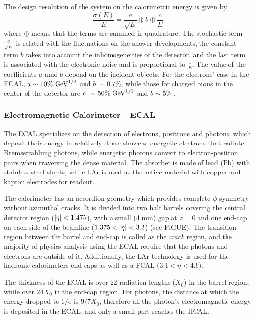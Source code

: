 The design resolution of the system on the calorimetric energy is given by
\begin{equation}
    \frac{\sigma(E)}{E} = 
    \frac{a}{\sqrt{E}} \oplus b \oplus \frac{c}{E}
\end{equation}
where \(\oplus\) means that the terms are summed in quadrature. The stochastic term \(\frac{a}{\sqrt{E}}\) is related with the fluctuations on the shower developments, the constant term \(b\) takes into account the inhomogeneities of the detector, and the last term is associated with the electronic noise and is proportional to \(\frac{1}{E}\). The value of the coefficients \(a\) amd \(b\) depend on the incident objects. For the electrons' case in the \ac{ECAL}, \(a\sim 10\%~\text{GeV}^{1/2}\) and \(b~\sim 0.7\%\), while those for charged pions in the center of the detector are \(a~\sim50\%~\text{GeV}^{1/2}\) and \(b\sim5\%\) \cite{PerformanceCalorimeteresRun2}.



\subsubsection{Electromagnetic Calorimeter - ECAL}

The \ac{ECAL} specializes on the detection of electrons, positrons and photons, which deposit their energy in relatively dense showers: energetic electrons that radiate Bremsstrahlung photons, while energetic photons convert to electron-positron pairs when traversing the dense material.
The absorber is made of lead (Pb) with stainless steel sheets, while \ac{LAr} is used as the active material with copper and kapton electrodes for readout.

The calorimeter has an accordion geometry which provides complete \(\phi\) symmetry without azimuthal cracks. 
It is divided into two half barrels covering the central detector region (\(|\eta|<1.475\)), with a small (4 mm) gap at $z = 0$ and one end-cap on each side of the beamline (\(1.375<\abseta<3.2\)) (see FIGUE).
The transition region between the barrel and end-cap is called as the \textit{crack} region, and the majority of physics analysis using the \ac{ECAL} require that the photons and electrons are outside of it.
Additionally, the \ac{LAr} technology is used for the hadronic calorimeters end-caps as well as a \ac{FCAL} ($3.1 < \eta < 4.9$).

The thickness of the \ac{ECAL} is over 22 radiation lengths (\(X_0\)) in the barrel region, while over \(24 X_0\) in the end-cap region. For photons, the distance at which the energy dropped to \(1/e\) is \(9/7 X_0\), therefore all the photon's electromagnetic energy is deposited in the \ac{ECAL}, and only a small part reaches the \ac{HCAL}.


